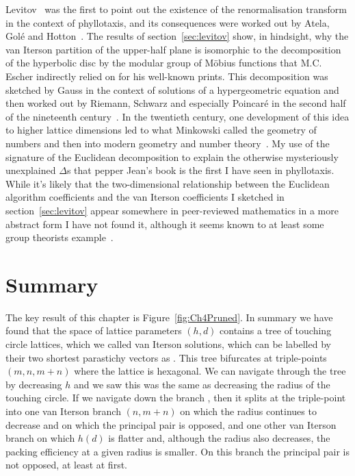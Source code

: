Levitov~\cite{levitovFibonacciNumbersBotany1991} was the first to point out the existence of the renormalisation transform in the context of phyllotaxis, and its consequences were worked out by Atela, Golé and Hotton~\autocite{atelaDynamicalSystemPlant2002}. 
 The results of section~\ref{sec:levitov} show, in hindsight, why the van Iterson partition of the upper-half plane is isomorphic to the decomposition of the hyperbolic disc by the modular group of M{\"o}bius functions that M.C. Escher indirectly relied on for his well-known prints. This decomposition was sketched by Gauss in the context of solutions of a hypergeometric equation and then worked out by Riemann,  Schwarz and especially Poincar\'{e} in the second half of the nineteenth century~\cite{gaussBemerkungFragmentenUber2011,poincarePapersFuchsianFunctions1985,schwarzUeberDiejenigenFalle1873,johnstillwellTranslatorNotePoincare1996}. 
  In the twentieth century, one development of this idea to higher lattice dimensions led to what Minkowski called the geometry of numbers and then into modern geometry and number theory~\cite{bergerGeometryRevealedJacob2010}.
My use of the signature of the Euclidean decomposition to explain the otherwise mysteriously unexplained $\Delta$s that pepper Jean's book is the first I have seen in phyllotaxis.   While it's likely that the  two-dimensional relationship between the Euclidean algorithm coefficients and the van Iterson coefficients I sketched in section~\ref{sec:levitov} appear somewhere in peer-reviewed mathematics in a more abstract form I have not found it, although it seems known to at least some group theorists example~\cite{conradIdealClassesSL22024}.  
 

\section{Summary}
\label{sec:ClassifyingSummary}
The key result of this chapter is Figure~\ref{fig:Ch4Pruned}. In summary we have found that the space of lattice parameters $(h,d)$ contains a tree of touching circle lattices, which we called van Iterson solutions, which can be  labelled by their two shortest parastichy vectors as . This tree bifurcates at triple-points $(m,n,m+n)$ where the lattice is hexagonal. We can navigate through the tree by decreasing $h$ and we saw this was the same as decreasing the radius of the touching circle. If we navigate down the branch , then it splits at the triple-point
into one van Iterson branch $(n,m+n)$ on which the radius continues to decrease and on which the principal pair is opposed, and one other van Iterson branch on which  $h(d)$ is flatter and, although the radius also decreases, the packing efficiency at a given radius is smaller. On this branch the principal pair is not opposed, at least at first. 


